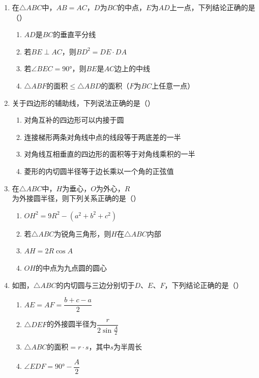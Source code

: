 \documentclass[12pt, a4paper]{ctexart}
\begin{document}
\begin{enumerate}[label=\arabic*.]

\item 在$\triangle ABC$中，$AB=AC$，$D$为$BC$的中点，$E$为$AD$上一点，下列结论正确的是（\quad）
\begin{enumerate}[label=]
\item $AD$是$BC$的垂直平分线
\item 若$BE \perp AC$，则$BD^2 = DE \cdot DA$
\item 若$\angle BEC = 90°$，则$BE$是$AC$边上的中线
\item $\triangle ABF$的面积$\leq \triangle ABD$的面积（$F$为$BC$上任意一点）
\end{enumerate}

\item 关于四边形的辅助线，下列说法正确的是（\quad）
\begin{enumerate}[label=]
\item 对角互补的四边形可以内接于圆
\item 连接梯形两条对角线中点的线段等于两底差的一半
\item 对角线互相垂直的四边形的面积等于对角线乘积的一半
\item 菱形的内切圆半径等于边长乘以一个角的正弦值
\end{enumerate}

\item 在$\triangle ABC$中，$H$为垂心，$O$为外心，$R$为外接圆半径，则下列关系正确的是（\quad）
\begin{enumerate}[label=]
\item $OH^2 = 9R^2 - (a^2+b^2+c^2)$
\item 若$\triangle ABC$为锐角三角形，则$H$在$\triangle ABC$内部
\item $AH = 2R\cos A$
\item $OH$的中点为九点圆的圆心
\end{enumerate}

\item 如图，$\triangle ABC$的内切圆与三边分别切于$D$、$E$、$F$，下列结论正确的是（\quad）
\begin{enumerate}[label=]
\item $AE = AF = \dfrac{b+c-a}{2}$
\item $\triangle DEF$的外接圆半径为$\dfrac{r}{2\sin\frac{A}{2}}$
\item $\triangle ABC$的面积$= r \cdot s$，其中$s$为半周长
\item $\angle EDF = 90° - \dfrac{A}{2}$
\end{enumerate}

\end{enumerate}
\end{document}
